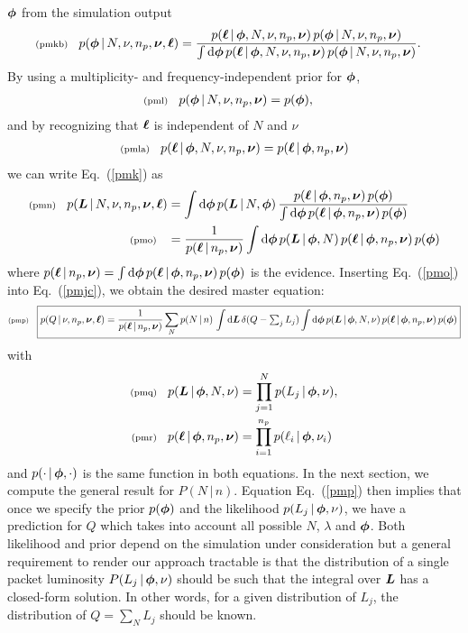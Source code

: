 \documentclass[11pt]{article}
\newcommand{\lleq}[1]{\label{#1} }
\renewcommand{\lleq}[1]{\label{#1} {\scriptstyle {\rm (#1)}} \hspace*{2ex} }
\newcommand{\cond}{\,|\,}
\newcommand{\refeq}[1]{Eq.~(\ref{#1})}
\newcommand{\npack}{n_p}
\newcommand{\Lumtot}{Q}
\newcommand{\Lum}{L}
\newcommand{\rmdx}[1]{\mbox{d} #1 \,} %
\begin{document}
${\bm{\phi}}$ from the simulation output
\begin{align}
  \lleq{pmkb}
  p(\bmphi\cond N,\nu, \npack,\bmnu, \bml) &=
  \frac{p(\bml\cond \bmphi, N,\nu, \npack,\bmnu)\,p(\bmphi\cond N,\nu, \npack,\bmnu)} %
  {\int \rmdx{\bmphi} p(\bml\cond \bmphi,N,\nu, \npack,\bmnu)\,p(\bmphi\cond N,\nu, \npack,\bmnu)}.
\end{align}
By using a multiplicity- and frequency-independent prior for ${\bm{\phi}}$,
\begin{align}
  \lleq{pml}
  p(\bmphi\cond N,\nu, \npack,\bmnu) &= p(\bmphi),
\end{align}
and by recognizing that ${\bm{\ell}}$ is independent of $N$ and $\nu$
\begin{align}
  \lleq{pmla}
  p(\bml\cond \bmphi,N,\nu, \npack,\bmnu) = p(\bml\cond \bmphi,\npack,\bmnu)
\end{align}
we can write \refeq{pmk} as
\begin{align}
  \lleq{pmn}
  p(\bmL\cond N,\nu, \npack,\bmnu, \bml)
  &= \int \rmdx{\bmphi} p(\bmL\cond N,\bmphi)\, %
  \frac{p(\bml\cond \bmphi, \npack, \bmnu)\,p(\bmphi)} %
  {\int \rmdx{\bmphi} p(\bml\cond \bmphi,\npack,\bmnu)\,p(\bmphi)} \\
  \lleq{pmo}
  &= \frac{1}  {p(\bml\cond \npack, \bmnu)} %
  \int \rmdx{\bmphi} p(\bmL\cond \bmphi, N)\, %
  p(\bml\cond \bmphi, \npack,\bmnu)\,p(\bmphi)
\end{align}
where $p(\bml\cond \npack, \bmnu) = \int \rmdx{\bmphi} p(\bml\cond
\bmphi, \npack,\bmnu)\,p(\bmphi)$ is the evidence.  Inserting \refeq{pmo}
into \refeq{pmjc}, we obtain the desired master equation:
\begin{equation}
  \lleq{pmp}
  \boxed{
  p(\Lumtot\cond \nu, \npack,\bmnu, \bml)
  = \frac{1}{p(\bml\cond \npack, \bmnu)}
  \sum_N p(N\cond n)\,\int \rmdx{\bmL} \delta(\Lumtot - \textstyle\sum_j \Lum_j)
  \displaystyle\int \rmdx{\bmphi} p(\bmL\cond \bmphi, N, \nu) \, p(\bml\cond \bmphi,\npack,\bmnu)
  \, p(\bmphi)
  }
\end{equation}
with
\begin{align}
  \lleq{pmq}
  p(\bmL\cond \bmphi, N, \nu) &= \prod_{j=1}^N p(\Lum_j\cond \bmphi, \nu), \\
  \lleq{pmr}
  p(\bml\cond \bmphi,\npack,\bmnu) &= \prod_{i=1}^{\npack} p(\ell_i\cond \bmphi, \nu_i)
\end{align}
and $p(\cdot \cond \bmphi, \cdot)$ is the same function in both
equations.  In the next section, we compute the general result for
$P(N \cond n)$. Equation \refeq{pmp} then implies that once we specify
the prior $p({\bm{\phi}})$ and the likelihood $p(\Lum_j\cond \bmphi, \nu)$, we
have a prediction for $\Lumtot$ which takes into account all possible $N$,
$\lambda$ and ${\bm{\phi}}$. Both likelihood and prior depend on the
simulation under consideration but a general requirement to render our
approach tractable is that the distribution of a single packet
luminosity $P(\Lum_j \cond \bmphi, \nu)$ should be such that the integral
over ${\bm{L}}$ has a closed-form solution. In other words, for a given
distribution of $\Lum_j$, the distribution of $\Lumtot = \sum_N \Lum_j$ should be
known.
\end{document}

